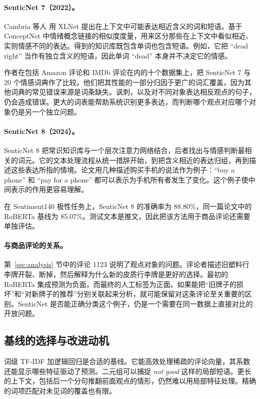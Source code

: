 \documentclass[11pt,a4paper]{article}
\begin{document}
\paragraph{SenticNet 7（2022）。}
Cambria 等人\citep{cambria2022senticnet} 用 XLNet 提出在上下文中可能表达相近含义的词和短语。基于 ConceptNet 中情绪概念链接的相似度度量，用来区分那些在上下文中看似相近、实则情感不同的表达。得到的知识库既包含单词也包含短语。例如，它把 ``dead right'' 当作有独立含义的短语，因此单词 ``dead'' 本身并不决定它的情感。

作者在包括 Amazon 评论和 IMDb 评论在内的十个数据集上，把 SenticNet 7 与 20 个情感词典作了比较。他们把其性能的一部分归因于更广的词汇覆盖，因为其他词典的常见错误来源是词条缺失。讽刺，以及对不同对象表达相反观点的句子，仍会造成错误。更大的词表能帮助系统识别更多表达，而判断哪个观点对应哪个对象仍是另一个独立问题。

\paragraph{SenticNet 8（2024）。}
SenticNet 8 把常识知识库与一个层次注意力网络结合，后者找出与情感判断最相关的词元\citep{cambria2024senticnet}。它的文本处理流程从统一措辞开始，到把含义相近的表达归组，再到描述这些表达所指的情境。论文用几种描述购买手机的说法作为例子：``buy a phone'' 和 ``pay for a phone'' 都可以表示为手机所有者发生了变化。这个例子使中间表示的作用更容易理解。

在 Sentiment140 极性任务上，SenticNet 8 的准确率为 88.80\%，同一篇论文中的 RoBERTa 基线为 85.07\%。测试文本是推文，因此把该方法用于商品评论还需要单独评估。

\paragraph{与商品评论的关系。}
第~\ref{sec:analysis} 节中的评论 1123 说明了观点对象的问题。评论者描述旧塑料行李牌开裂、断掉，然后解释为什么新的皮质行李牌是更好的选择。最初的 RoBERTa 集成预测为负面，而最终的人工标签为正面。如果能把``旧牌子的损坏''和``对新牌子的推荐''分别关联起来分析，就可能保留对这条评论至关重要的区别。SenticNet 是否能正确分类这个例子，仍是一个需要在同一数据上直接对比的开放问题。

\subsection{基线的选择与改进动机}\label{sec:baseline}
词级 TF-IDF 加逻辑回归是合适的基线。它能高效处理稀疏的评论向量，其系数还能显示哪些特征驱动了预测。二元组可以捕捉 \emph{not good} 这样的局部短语。更长的上下文，包括后一个分句推翻前面观点的情形，仍然难以用局部特征处理。精确的词项匹配对未见词的覆盖也有限。
\end{document}
